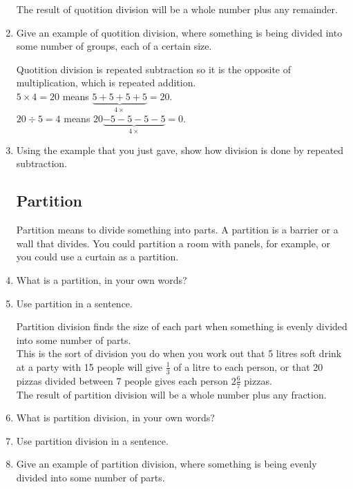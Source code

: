\documentclass[12pt]{article}
\begin{document}
\begin{enumerate}
The result of quotition division will be a whole number plus any remainder.\\

\item Give an example of quotition division, where something is being divided into some number of groups, each of a certain size.

Quotition division is repeated subtraction so it is the opposite of multiplication, which is repeated addition.\\

$5 \times 4 = 20$ means $\underbrace{ 5 + 5 + 5 + 5}_{4 \times} = 20$.\\

$20 \div 5 = 4$ means $20 \underbrace{- 5 - 5 - 5 - 5}_{4 \times} = 0$.\\

\item Using the example that you just gave, show how division is done by repeated subtraction.

\subsection*{Partition}

Partition means to divide something into parts. A partition is a barrier or a wall that divides. You could partition a room with panels, for example, or you could use a curtain as a partition.\\

\item What is a partition, in your own words?
\item Use partition in a sentence.

Partition division finds the size of each part when something is evenly divided into some number of parts.\\

This is the sort of division you do when you work out that 5 litres soft drink at a party with 15 people will give $\frac{1}{3}$ of a litre to each person, or that 20 pizzas divided between 7 people gives each person $2 \frac{6}{7}$ pizzas.\\

The result of partition division will be a whole number plus any fraction.

\item What is partition division, in your own words?
\item Use partition division in a sentence.
\item Give an example of partition division, where something is being evenly divided into some number of parts.


\end{enumerate}
\end{document}
